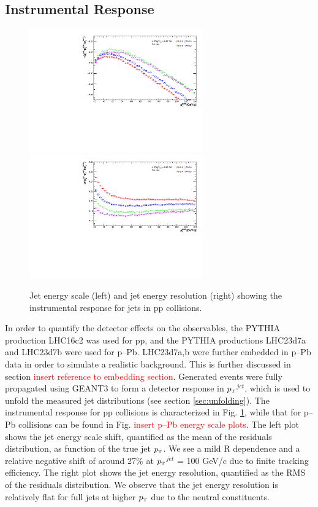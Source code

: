 \documentclass[ALICE]{ALICE_analysis_notes}
\newcommand{\pT}{$p_{\mbox{\tiny T}}$\xspace}
\newcommand{\pPb}{{\mbox{p--Pb}}\xspace}
\newcommand{\pp}{pp\xspace}
\begin{document}
\subsection{Instrumental Response}
\label{sec:InstResponse}

\begin{figure}[h!]
    \centering
    \begin{multicols}{2}
            \includegraphics[width=7.5cm]{figures/EnergyScale/EnergyScaleMean.pdf}
        \vfill\null 
        \columnbreak
            \includegraphics[width=7.5cm]{figures/EnergyScale/EnergyScaleWidth.pdf}
        \vfill\null
    \end{multicols}
    \caption{Jet energy scale (left) and jet energy resolution (right) showing the instrumental response for jets in \pp collisions.}
    \label{fig:EnergyScale}
\end{figure}

In order to quantify the detector effects on the observables, the PYTHIA production LHC16c2 was used for \pp, and the PYTHIA productions LHC23d7a and LHC23d7b were used for \pPb. LHC23d7a,b were further embedded in \pPb data in order to simulate a realistic background. This is further discussed in section \textcolor{red}{insert reference to embedding section}. Generated events were fully propagated using GEANT3 to form a detector response in \pT$^{jet}$, which is used to unfold the measured jet distributions (see section \ref{sec:unfolding}). The instrumental response for \pp collisions is characterized in Fig. \ref{fig:EnergyScale}, while that for \pPb collisions can be found in Fig. \textcolor{red}{insert \pPb energy scale plots}. The left plot shows the jet energy scale shift, quantified as the mean of the residuals distribution, as function of the true jet \pT. We see a mild R dependence and a relative negative shift of around 27\% at \pT$^{jet}$ = 100 GeV/c due to finite tracking efficiency. The right plot shows the jet energy resolution, quantified as the RMS of the residuals distribution. We observe that the jet energy resolution is relatively flat for full jets at higher \pT due to the neutral constituents.
\end{document}
